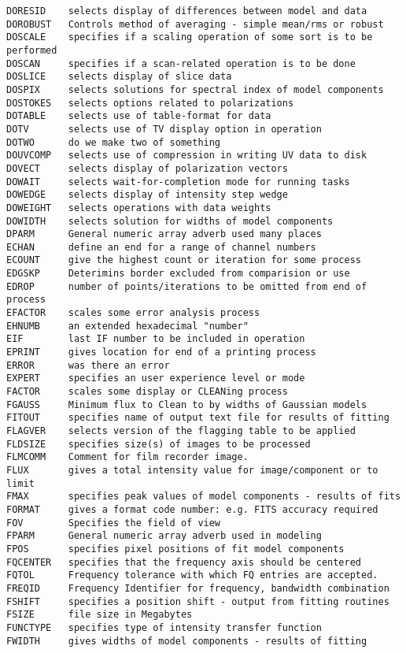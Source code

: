 \begin{verbatim}
DORESID    selects display of differences between model and data
DOROBUST   Controls method of averaging - simple mean/rms or robust
DOSCALE    specifies if a scaling operation of some sort is to be performed
DOSCAN     specifies if a scan-related operation is to be done
DOSLICE    selects display of slice data
DOSPIX     selects solutions for spectral index of model components
DOSTOKES   selects options related to polarizations
DOTABLE    selects use of table-format for data
DOTV       selects use of TV display option in operation
DOTWO      do we make two of something
DOUVCOMP   selects use of compression in writing UV data to disk
DOVECT     selects display of polarization vectors
DOWAIT     selects wait-for-completion mode for running tasks
DOWEDGE    selects display of intensity step wedge
DOWEIGHT   selects operations with data weights
DOWIDTH    selects solution for widths of model components
DPARM      General numeric array adverb used many places
ECHAN      define an end for a range of channel numbers
ECOUNT     give the highest count or iteration for some process
EDGSKP     Deterimins border excluded from comparision or use
EDROP      number of points/iterations to be omitted from end of process
EFACTOR    scales some error analysis process
EHNUMB     an extended hexadecimal "number"
EIF        last IF number to be included in operation
EPRINT     gives location for end of a printing process
ERROR      was there an error
EXPERT     specifies an user experience level or mode
FACTOR     scales some display or CLEANing process
FGAUSS     Minimum flux to Clean to by widths of Gaussian models
FITOUT     specifies name of output text file for results of fitting
FLAGVER    selects version of the flagging table to be applied
FLDSIZE    specifies size(s) of images to be processed
FLMCOMM    Comment for film recorder image.
FLUX       gives a total intensity value for image/component or to limit
FMAX       specifies peak values of model components - results of fits
FORMAT     gives a format code number: e.g. FITS accuracy required
FOV        Specifies the field of view
FPARM      General numeric array adverb used in modeling
FPOS       specifies pixel positions of fit model components
FQCENTER   specifies that the frequency axis should be centered
FQTOL      Frequency tolerance with which FQ entries are accepted.
FREQID     Frequency Identifier for frequency, bandwidth combination
FSHIFT     specifies a position shift - output from fitting routines
FSIZE      file size in Megabytes
FUNCTYPE   specifies type of intensity transfer function
FWIDTH     gives widths of model components - results of fitting

\end{verbatim}
